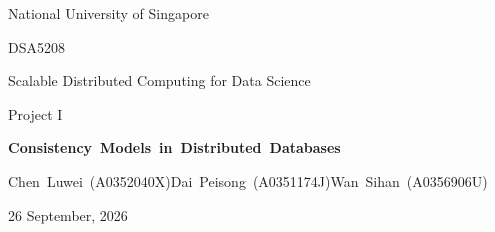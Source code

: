 \documentclass[11pt,a4paper]{article}
\begin{document}
\hypersetup{pageanchor=false}
\begin{titlepage}
\centering
\vspace*{25mm}
{\large National University of Singapore\par}
\vspace{15mm}
{\large DSA5208\par}
\vspace{3mm}
{\large Scalable Distributed Computing for Data Science\par}
\vspace{3mm}
{\large Project I\par}
\vspace{20mm}
{\Large\bfseries\mbox{Consistency Models in Distributed Databases}\par}
\vspace{20mm}
{\small\mbox{Chen Luwei (A0352040X)\quad Dai Peisong (A0351174J)\quad Wan Sihan (A0356906U)}\par}
\vfill
{\large 26 September, 2026\par}
\vspace*{15mm}
\end{titlepage}
\hypersetup{pageanchor=true,linktoc=all}
\begingroup
\setlength{\parskip}{0pt}
\tableofcontents
\endgroup
\clearpage
{}





\clearpage

\clearpage
\begingroup
\small
\setlength{\parskip}{3pt}
\end{document}
